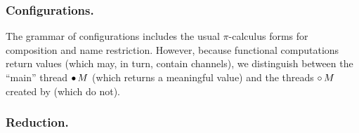 \documentclass[oribibl,orivec,envcountsame]{llncs}
\begin{document}

\subsubsection{Configurations.}

The grammar of configurations includes the usual $\pi$-calculus forms for composition and name
restriction.  However, because functional computations return values (which may, in turn, contain
channels), we distinguish between the ``main'' thread ${\mathord{\bullet}}\,M$ (which returns a meaningful
value) and the threads ${\mathord{\circ}}\,M$ created by  (which do not).

\subsubsection{Reduction.}
\end{document}
